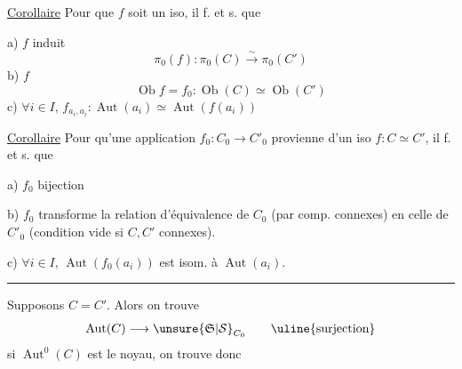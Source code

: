 \uline{Corollaire} Pour que $f$ soit un iso, il f. et s. que

a) $f$ induit
\[
\pi_0(f):\pi_0(C)\xrightarrow{\sim}\pi_0(C')
\]
b) $f$ 
\[
\operatorname{Ob}f=f_0:\operatorname{Ob}(C)\simeq\operatorname{Ob}(C')
\]
c) $\forall i\in I$, $f_{a_i,a_i}:\operatorname{Aut}(a_i)\simeq\operatorname{Aut}(f(a_i))$


\uline{Corollaire} Pour qu'une application $f_0:C_0\longrightarrow C'_0$ provienne d'un iso $f:C\simeq C'$, il f. et s. que

a) $f_0$  bijection

b) $f_0$ transforme la relation d'équivalence de $C_0$ (par comp. connexes) en celle de $C'_0$ (condition vide si $C,C'$ connexes).

c) $\forall i\in I$, $\operatorname{Aut}(f_0(a_i))$ est isom. à $\operatorname{Aut}(a_i)$.

\par\hfill\rule{1.5cm}{.4pt}\hfill\par
{} Supposons $C=C'$. Alors on trouve
\[
\operatorname{Aut}(C)\longrightarrow\unsure{\mathfrak S|\mathcal S}_{C_0}\qquad\uline{\text{surjection}}
\]
si $\operatorname{Aut}^0(C)$ est le noyau, on trouve donc
